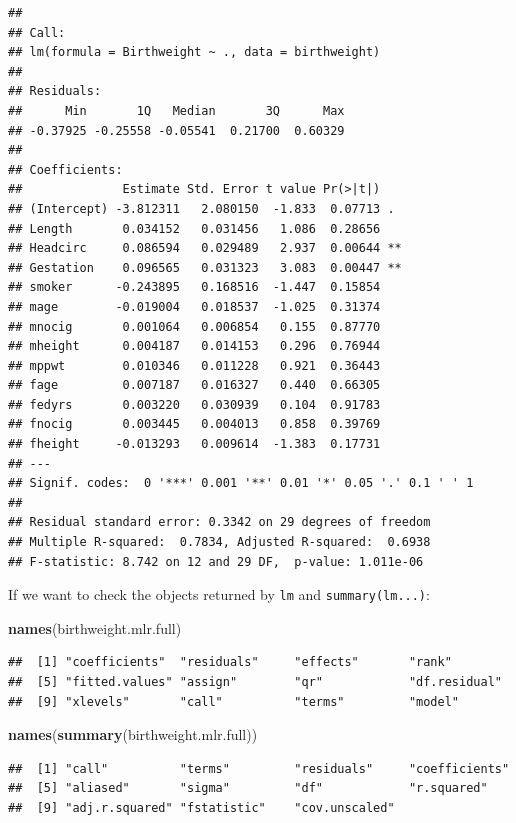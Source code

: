 \documentclass[
]{book}
\newenvironment{Shaded}{\begin{snugshade}}{\end{snugshade}}
\newcommand{\FunctionTok}[1]{\textcolor[rgb]{0.13,0.29,0.53}{\textbf{#1}}}
\newcommand{\NormalTok}[1]{#1}
\begin{document}
\begin{verbatim}
## 
## Call:
## lm(formula = Birthweight ~ ., data = birthweight)
## 
## Residuals:
##      Min       1Q   Median       3Q      Max 
## -0.37925 -0.25558 -0.05541  0.21700  0.60329 
## 
## Coefficients:
##              Estimate Std. Error t value Pr(>|t|)   
## (Intercept) -3.812311   2.080150  -1.833  0.07713 . 
## Length       0.034152   0.031456   1.086  0.28656   
## Headcirc     0.086594   0.029489   2.937  0.00644 **
## Gestation    0.096565   0.031323   3.083  0.00447 **
## smoker      -0.243895   0.168516  -1.447  0.15854   
## mage        -0.019004   0.018537  -1.025  0.31374   
## mnocig       0.001064   0.006854   0.155  0.87770   
## mheight      0.004187   0.014153   0.296  0.76944   
## mppwt        0.010346   0.011228   0.921  0.36443   
## fage         0.007187   0.016327   0.440  0.66305   
## fedyrs       0.003220   0.030939   0.104  0.91783   
## fnocig       0.003445   0.004013   0.858  0.39769   
## fheight     -0.013293   0.009614  -1.383  0.17731   
## ---
## Signif. codes:  0 '***' 0.001 '**' 0.01 '*' 0.05 '.' 0.1 ' ' 1
## 
## Residual standard error: 0.3342 on 29 degrees of freedom
## Multiple R-squared:  0.7834, Adjusted R-squared:  0.6938 
## F-statistic: 8.742 on 12 and 29 DF,  p-value: 1.011e-06
\end{verbatim}

If we want to check the objects returned by \texttt{lm} and \texttt{summary(lm...)}:

\begin{Shaded}
\begin{Highlighting}[]
\FunctionTok{names}\NormalTok{(birthweight.mlr.full)}
\end{Highlighting}
\end{Shaded}

\begin{verbatim}
##  [1] "coefficients"  "residuals"     "effects"       "rank"         
##  [5] "fitted.values" "assign"        "qr"            "df.residual"  
##  [9] "xlevels"       "call"          "terms"         "model"
\end{verbatim}

\begin{Shaded}
\begin{Highlighting}[]
\FunctionTok{names}\NormalTok{(}\FunctionTok{summary}\NormalTok{(birthweight.mlr.full)) }
\end{Highlighting}
\end{Shaded}

\begin{verbatim}
##  [1] "call"          "terms"         "residuals"     "coefficients" 
##  [5] "aliased"       "sigma"         "df"            "r.squared"    
##  [9] "adj.r.squared" "fstatistic"    "cov.unscaled"
\end{verbatim}
\end{document}
